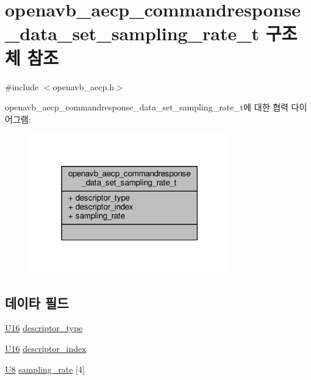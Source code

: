 \hypertarget{structopenavb__aecp__commandresponse__data__set__sampling__rate__t}{}\section{openavb\+\_\+aecp\+\_\+commandresponse\+\_\+data\+\_\+set\+\_\+sampling\+\_\+rate\+\_\+t 구조체 참조}
\label{structopenavb__aecp__commandresponse__data__set__sampling__rate__t}


{\ttfamily \#include $<$openavb\+\_\+aecp.\+h$>$}



openavb\+\_\+aecp\+\_\+commandresponse\+\_\+data\+\_\+set\+\_\+sampling\+\_\+rate\+\_\+t에 대한 협력 다이어그램\+:
\nopagebreak
\begin{figure}[H]
\begin{center}
\leavevmode
\includegraphics[width=247pt]{structopenavb__aecp__commandresponse__data__set__sampling__rate__t__coll__graph}
\end{center}
\end{figure}
\subsection*{데이타 필드}
\begin{DoxyCompactItemize}
\item 
\hyperlink{openavb__types__base__pub_8h_a0a0a322d5fa4a546d293a77ba8b4a71f}{U16} \hyperlink{structopenavb__aecp__commandresponse__data__set__sampling__rate__t_a1e231d7874aada5925b29affc76782cc}{descriptor\+\_\+type}
\item 
\hyperlink{openavb__types__base__pub_8h_a0a0a322d5fa4a546d293a77ba8b4a71f}{U16} \hyperlink{structopenavb__aecp__commandresponse__data__set__sampling__rate__t_ab26fb363c24b9a2a4391f9171c981b08}{descriptor\+\_\+index}
\item 
\hyperlink{openavb__types__base__pub_8h_aa63ef7b996d5487ce35a5a66601f3e73}{U8} \hyperlink{structopenavb__aecp__commandresponse__data__set__sampling__rate__t_a6b09041f69d1e15bd5278514758e680a}{sampling\+\_\+rate} \mbox{[}4\mbox{]}
\end{DoxyCompactItemize}


